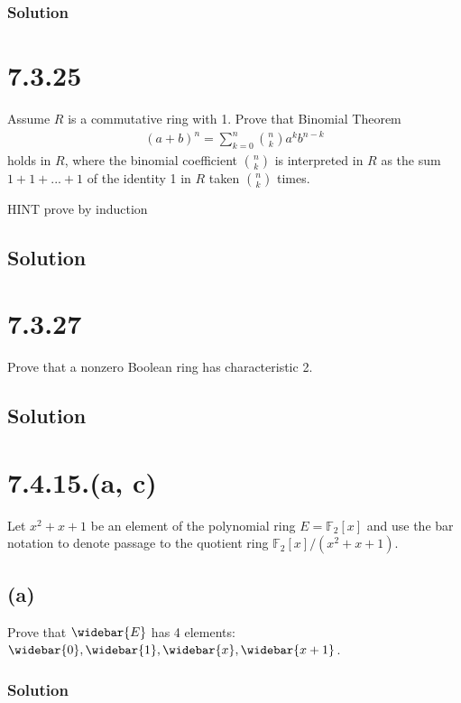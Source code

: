 \documentclass[fleqn]{article}
\begin{document}
            \subsubsection{Solution}
            
    
    \section{7.3.25}
    Assume $R$ is a commutative ring with 1.  Prove that Binomial Theorem
    \begin{align}
        (a + b)^n = \sum\limits_{k = 0}^{n} \binom{n}{k} a^k b^{n - k}
    \end{align}
    holds in $R$, where the binomial coefficient $\binom{n}{k}$ is interpreted in $R$ as the sum $1 + 1 + ... + 1$ of the identity 1 in $R$ taken $\binom{n}{k}$ times.
    
    HINT prove by induction
        
        \subsection{Solution}
        
    
    \section{7.3.27}
    Prove that a nonzero Boolean ring has characteristic 2.
        
        \subsection{Solution}
        
    
    \section{7.4.15.(a, c)}
    Let $x^2 + x + 1$ be an element of the polynomial ring $E = \mathbb{F}_2[x]$ and use the bar notation to denote passage to the quotient ring $\mathbb{F}_2[x] / (x^2 + x + 1)$.
    
        \subsection{(a)}
        Prove that $\widebar{E}$ has 4 elements: $\widebar{0}, \widebar{1}, \widebar{x}, \widebar{x + 1}$.
            
            \subsubsection{Solution}
            
\end{document}

